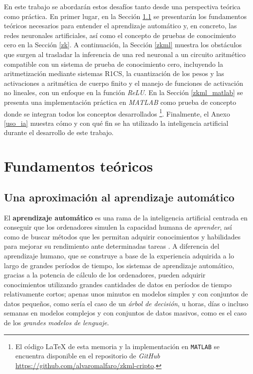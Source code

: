 \documentclass[a4paper, 11pt]{article}
\begin{document}
En este trabajo se abordarán estos desafíos tanto desde una perspectiva teórica como práctica. En
primer lugar, en la Sección \ref{aprendizaje_automatico} se presentarán los fundamentos teóricos
necesarios para entender el aprendizaje automático y, en concreto, las redes neuronales artificiales,
así como el concepto de pruebas de conocimiento cero en la Sección \ref{zk}. A continuación, la
Sección \ref{zkml} muestra los obstáculos que surgen al trasladar la inferencia de una red neuronal
a un circuito aritmético compatible con un sistema de prueba de conocimiento cero, incluyendo la
aritmetización mediante sistemas R1CS, la cuantización de los pesos y las activaciones a aritmética
de cuerpo finito y el manejo de funciones de activación no lineales, con un enfoque en la función
\textit{ReLU}. En la Sección \ref{zkml_matlab} se presenta una implementación práctica en
\textit{MATLAB} como prueba de concepto donde se integran todos los conceptos desarrollados \footnote{
  El código LaTeX de esta memoria y la implementación en \texttt{MATLAB} se encuentra disponible en
  el repositorio de \textit{GitHub} \url{https://github.com/alvaromalfaro/zkml-cripto}.
}. Finalmente, el Anexo \ref{uso_ia} muestra cómo y con qué fin se ha utilizado la inteligencia
artificial durante el desarrollo de este trabajo.

\section{Fundamentos teóricos} \label{fundamentos}


\subsection{Una aproximación al aprendizaje automático} \label{aprendizaje_automatico}

El \textbf{aprendizaje automático} es una rama de la inteligencia artificial centrada en conseguir
que los ordenadores simulen la capacidad humana de \textit{aprender}, así como de buscar métodos que
les permitan adquirir conocimientos y habilidades para mejorar su rendimiento ante determinadas
tareas \cite{5362936}. A diferencia del aprendizaje humano, que se construye a base de la
experiencia adquirida a lo largo de grandes períodos de tiempo, los sistemas de aprendizaje
automático, gracias a la potencia de cálculo de los ordenadores, pueden adquirir conocimientos
utilizando grandes cantidades de datos en períodos de tiempo relativamente cortos; apenas unos
minutos en modelos simples y con conjuntos de datos pequeños, como sería el caso de un
\textit{árbol de decisión}, u horas, días o incluso semanas en modelos complejos y con conjuntos de
datos masivos, como es el caso de los \textit{grandes modelos de lenguaje}.
\end{document}
